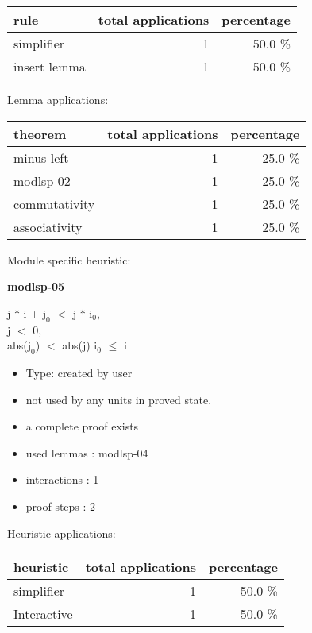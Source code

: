 \documentclass[a4paper]{article}
\begin{document}
\begin{supertabular}{l|r|r}
rule	        & total applications & percentage \\ \hline
simplifier & 1 & 50.0 \% \\
insert lemma & 1 & 50.0 \% \\

\end{supertabular}

Lemma applications:

\begin{supertabular}{l|r|r}
theorem	        & total applications & percentage \\ \hline
minus-left & 1 & 25.0 \% \\
modlsp-02 & 1 & 25.0 \% \\
commutativity & 1 & 25.0 \% \\
associativity & 1 & 25.0 \% \\

\end{supertabular}

Module specific heuristic:

\pagebreak

{\LARGE\bf modlsp-05}\label{lemma-modlsp-05}

\medskip

j $*$ i + $\mbox{j}_{0}$ $<$ j $*$ $\mbox{i}_{0}$, \\
j $<$ 0, \\
abs($\mbox{j}_{0}$) $<$ abs(j) \Fol $\mbox{i}_{0}$ $\le$ i

\begin{itemize}

\item Type: created by user

\item not used by any units in proved state.
\item       a complete proof exists
\item       used lemmas  : modlsp-04
\item       interactions : 1
\item       proof steps  : 2
\end{itemize}

\medskip


Heuristic applications:

\begin{supertabular}{l|r|r}
heuristic	& total applications & percentage \\ \hline
simplifier & 1 & 50.0 \% \\
Interactive & 1 & 50.0 \% \\

\end{supertabular}
\end{document}

